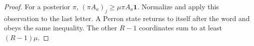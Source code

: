 \begin{proof}
For a posterior $\pi$, $(\pi A_a)_j\ge\mu\pi A_a\mathbf1$.
Normalize and apply this observation to the last letter. A Perron
state returns to itself after the word and obeys the same inequality.
The other $R-1$ coordinates sum to at least $(R-1)\mu$.
\end{proof}

